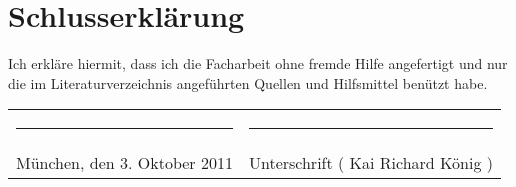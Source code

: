\appendix

\chapter{Schlusserklärung}

Ich erkläre hiermit, dass ich die Facharbeit ohne fremde Hilfe angefertigt und nur die im 
Literaturverzeichnis angeführten Quellen und Hilfsmittel benützt habe.
\newline
\newline
\newline

\begin{tabular}{lr}
    \rule{5cm}{0pt} & \rule{6cm}{1pt} \\
 München, den 3. Oktober 2011 &  Unterschrift ( Kai Richard König )
\end{tabular}
\vspace{1cm}

 
